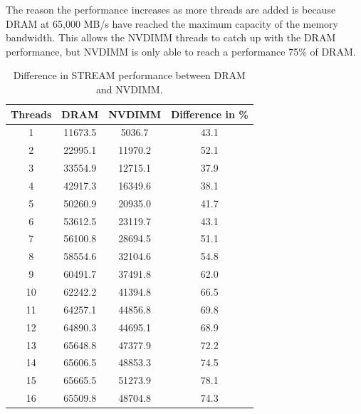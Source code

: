 \documentclass[12pt,a4paper,USenglish]{article}      %
\begin{document}
The reason the performance increases as more threads are added is because DRAM at 65,000 MB/s have reached the maximum capacity of the memory bandwidth. This allows the NVDIMM threads to catch up with the DRAM performance, but NVDIMM is only able to reach a performance 75\% of DRAM.

\begin{table}[!hbtp]
\begin{tabular}{ |c|c|c|c| }
\hline
Threads & DRAM & NVDIMM & Difference in \%\\
\hline
1 & 11673.5 & 5036.7 & 43.1 \\
\hline
2 & 22995.1 & 11970.2 & 52.1 \\
\hline
3 & 33554.9 & 12715.1 & 37.9 \\
\hline
4 & 42917.3 & 16349.6 & 38.1 \\
\hline
5 & 50260.9 & 20935.0 & 41.7 \\
\hline
6 & 53612.5 & 23119.7 & 43.1 \\
\hline
7 & 56100.8 & 28694.5 & 51.1 \\
\hline
8 & 58554.6 & 32104.6 & 54.8 \\
\hline
9 & 60491.7 & 37491.8 & 62.0 \\
\hline
10 & 62242.2 & 41394.8 & 66.5 \\
\hline
11 & 64257.1 & 44856.8 & 69.8 \\
\hline
12 & 64890.3 & 44695.1 & 68.9 \\
\hline
13 & 65648.8 & 47377.9 & 72.2 \\
\hline
14 & 65606.5 & 48853.3 & 74.5 \\
\hline
15 & 65665.5 & 51273.9 & 78.1 \\
\hline
16 & 65509.8 & 48704.8 & 74.3 \\
\hline
\end{tabular}
\caption{Difference in STREAM performance between DRAM and NVDIMM.}
\label{tab:Q1}
\end{table}


\printbibliography


\end{document}
